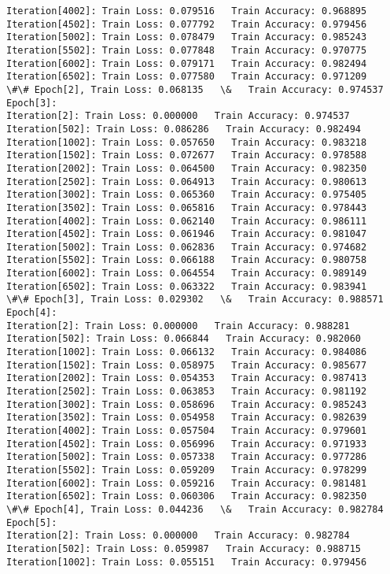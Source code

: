 \documentclass[11pt]{article}
\begin{document}
\begin{Verbatim}[commandchars=\\\{\}]
Iteration[4002]: Train Loss: 0.079516   Train Accuracy: 0.968895 
Iteration[4502]: Train Loss: 0.077792   Train Accuracy: 0.979456 
Iteration[5002]: Train Loss: 0.078479   Train Accuracy: 0.985243 
Iteration[5502]: Train Loss: 0.077848   Train Accuracy: 0.970775 
Iteration[6002]: Train Loss: 0.079171   Train Accuracy: 0.982494 
Iteration[6502]: Train Loss: 0.077580   Train Accuracy: 0.971209 
\#\# Epoch[2], Train Loss: 0.068135   \&   Train Accuracy: 0.974537
Epoch[3]:
Iteration[2]: Train Loss: 0.000000   Train Accuracy: 0.974537 
Iteration[502]: Train Loss: 0.086286   Train Accuracy: 0.982494 
Iteration[1002]: Train Loss: 0.057650   Train Accuracy: 0.983218 
Iteration[1502]: Train Loss: 0.072677   Train Accuracy: 0.978588 
Iteration[2002]: Train Loss: 0.064500   Train Accuracy: 0.982350 
Iteration[2502]: Train Loss: 0.064913   Train Accuracy: 0.980613 
Iteration[3002]: Train Loss: 0.065360   Train Accuracy: 0.975405 
Iteration[3502]: Train Loss: 0.065816   Train Accuracy: 0.978443 
Iteration[4002]: Train Loss: 0.062140   Train Accuracy: 0.986111 
Iteration[4502]: Train Loss: 0.061946   Train Accuracy: 0.981047 
Iteration[5002]: Train Loss: 0.062836   Train Accuracy: 0.974682 
Iteration[5502]: Train Loss: 0.066188   Train Accuracy: 0.980758 
Iteration[6002]: Train Loss: 0.064554   Train Accuracy: 0.989149 
Iteration[6502]: Train Loss: 0.063322   Train Accuracy: 0.983941 
\#\# Epoch[3], Train Loss: 0.029302   \&   Train Accuracy: 0.988571
Epoch[4]:
Iteration[2]: Train Loss: 0.000000   Train Accuracy: 0.988281 
Iteration[502]: Train Loss: 0.066844   Train Accuracy: 0.982060 
Iteration[1002]: Train Loss: 0.066132   Train Accuracy: 0.984086 
Iteration[1502]: Train Loss: 0.058975   Train Accuracy: 0.985677 
Iteration[2002]: Train Loss: 0.054353   Train Accuracy: 0.987413 
Iteration[2502]: Train Loss: 0.063853   Train Accuracy: 0.981192 
Iteration[3002]: Train Loss: 0.058696   Train Accuracy: 0.985243 
Iteration[3502]: Train Loss: 0.054958   Train Accuracy: 0.982639 
Iteration[4002]: Train Loss: 0.057504   Train Accuracy: 0.979601 
Iteration[4502]: Train Loss: 0.056996   Train Accuracy: 0.971933 
Iteration[5002]: Train Loss: 0.057338   Train Accuracy: 0.977286 
Iteration[5502]: Train Loss: 0.059209   Train Accuracy: 0.978299 
Iteration[6002]: Train Loss: 0.059216   Train Accuracy: 0.981481 
Iteration[6502]: Train Loss: 0.060306   Train Accuracy: 0.982350 
\#\# Epoch[4], Train Loss: 0.044236   \&   Train Accuracy: 0.982784
Epoch[5]:
Iteration[2]: Train Loss: 0.000000   Train Accuracy: 0.982784 
Iteration[502]: Train Loss: 0.059987   Train Accuracy: 0.988715 
Iteration[1002]: Train Loss: 0.055151   Train Accuracy: 0.979456 

\end{Verbatim}
\end{document}
